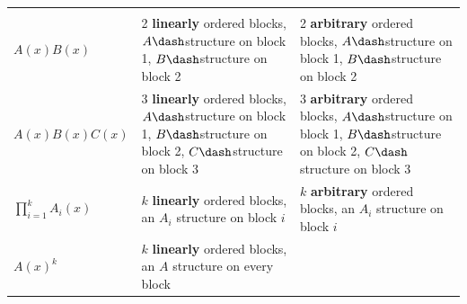 \begin{longtable}[]{@{}lll@{}}
\begin{minipage}[t]{0.30\columnwidth}
\strut
\end{minipage}\tabularnewline
\begin{minipage}[t]{0.30\columnwidth}\raggedright
\(A(x)B(x)\)\strut
\end{minipage} & \begin{minipage}[t]{0.30\columnwidth}\raggedright
2 \textbf{linearly} ordered blocks, \(A\dash\)structure on block 1,
\(B\dash\)structure on block 2\strut
\end{minipage} & \begin{minipage}[t]{0.30\columnwidth}\raggedright
2 \textbf{arbitrary} ordered blocks, \(A\dash\)structure on block 1,
\(B\dash\)structure on block 2\strut
\end{minipage}\tabularnewline
\begin{minipage}[t]{0.30\columnwidth}\raggedright
\(A(x)B(x)C(x)\)\strut
\end{minipage} & \begin{minipage}[t]{0.30\columnwidth}\raggedright
3 \textbf{linearly} ordered blocks, \(A\dash\)structure on block 1,
\(B\dash\)structure on block 2, \(C\dash\)structure on block 3\strut
\end{minipage} & \begin{minipage}[t]{0.30\columnwidth}\raggedright
3 \textbf{arbitrary} ordered blocks, \(A\dash\)structure on block 1,
\(B\dash\)structure on block 2, \(C\dash\)structure on block 3\strut
\end{minipage}\tabularnewline
\begin{minipage}[t]{0.30\columnwidth}\raggedright
\(\displaystyle \prod_{i=1}^k A_i(x)\)\strut
\end{minipage} & \begin{minipage}[t]{0.30\columnwidth}\raggedright
\(k\) \textbf{linearly} ordered blocks, an \(A_i\) structure on block
\(i\)\strut
\end{minipage} & \begin{minipage}[t]{0.30\columnwidth}\raggedright
\(k\) \textbf{arbitrary} ordered blocks, an \(A_i\) structure on block
\(i\)\strut
\end{minipage}\tabularnewline
\begin{minipage}[t]{0.30\columnwidth}\raggedright
\(A(x)^k\)\strut
\end{minipage} & \begin{minipage}[t]{0.30\columnwidth}\raggedright
\(k\) \textbf{linearly} ordered blocks, an \(A\) structure on every
block\strut
\end{minipage} & \begin{minipage}[t]{0.30\columnwidth}\raggedright

\end{minipage}
\end{longtable}

